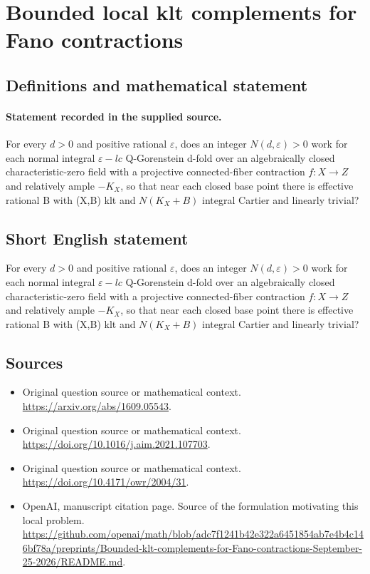 \documentclass[11pt]{article}
\begin{document}
\section*{Bounded local klt complements for Fano contractions}\label{30007014}
\subsection{Definitions and mathematical statement}
\paragraph{Statement recorded in the supplied source.}
For every $d>0$ and positive rational $\varepsilon $, does an integer $N(d,\varepsilon )>0$ work for each normal integral $\varepsilon -lc$ Q-Gorenstein d-fold over an algebraically closed characteristic-zero field with a projective connected-fiber contraction $f:X\to Z$ and relatively ample $-K_X$, so that near each closed base point there is effective rational B with (X,B) klt and $N(K_X+B)$ integral Cartier and linearly trivial?
\subsection{Short English statement}
For every $d>0$ and positive rational $\varepsilon $, does an integer $N(d,\varepsilon )>0$ work for each normal integral $\varepsilon -lc$ Q-Gorenstein d-fold over an algebraically closed characteristic-zero field with a projective connected-fiber contraction $f:X\to Z$ and relatively ample $-K_X$, so that near each closed base point there is effective rational B with (X,B) klt and $N(K_X+B)$ integral Cartier and linearly trivial?
\subsection{Sources}
\begin{itemize}
\item[S1] Original question source or mathematical context.
\url{https://arxiv.org/abs/1609.05543}.
\item[S2] Original question source or mathematical context.
\url{https://doi.org/10.1016/j.aim.2021.107703}.
\item[S3] Original question source or mathematical context.
\url{https://doi.org/10.4171/owr/2004/31}.
\item[S4] OpenAI, manuscript citation page. Source of the formulation motivating this local problem.
\url{https://github.com/openai/math/blob/adc7f1241b42e322a6451854ab7e4b4c146bf78a/preprints/Bounded-klt-complements-for-Fano-contractions-September-25-2026/README.md}.
\end{itemize}
\end{document}
